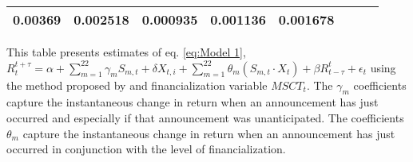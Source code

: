 \begin{sidewaystable}
{\begin{tabular}{@{}lllllllllllll@{}}
\multicolumn{2}{c}{ 0.00369 }                                                 & \multicolumn{2}{c}{ 0.002518 }                                                 & \multicolumn{2}{c}{ 0.000935 }                                                 & \multicolumn{2}{c}{ 0.001136 }                                                   & \multicolumn{2}{c}{ 0.001678 }                                                 \\ \bottomrule 
\end{tabular}
}
\begin{tablenotes}\item 
    \singlespacing
    \footnotesize
    This table presents estimates of eq. \ref{eq:Model 1}, $R_{t}^{t+\tau}=\alpha+\sum_{m=1}^{22} \gamma_m S_{m,t}+ \delta X_{t,i} + \sum_{m=1}^{22} \theta_m (S_{m,t} \cdot X_t)+\beta R_{t-\tau}^{t}+\epsilon_{t}$ using the method proposed by \citet{kurov2019price} and financialization variable $MSCT_t$. The $\gamma_m$ coefficients capture the instantaneous change in return when an announcement has just occurred and especially if that announcement was unanticipated. The coefficients $\theta_m$ capture the instantaneous change in return when an announcement has just occurred in conjunction with the level of financialization.
\end{tablenotes}
\end{sidewaystable}

